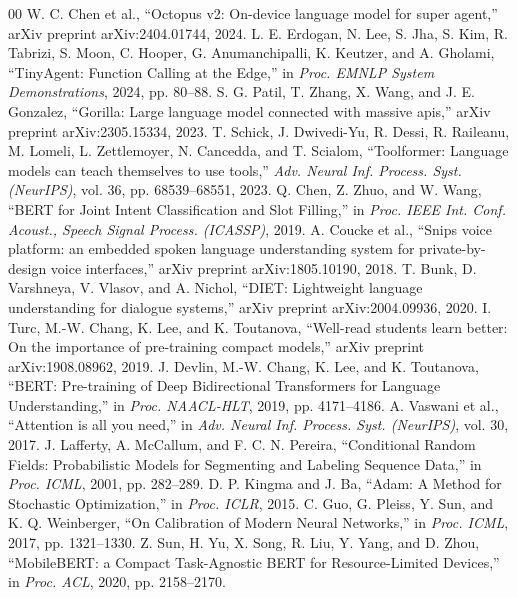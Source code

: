 \documentclass[conference]{IEEEtran}
\begin{document}
\begin{thebibliography}{00}
 W. C. Chen et al., ``Octopus v2: On-device language model for super agent,'' arXiv preprint arXiv:2404.01744, 2024.
 L. E. Erdogan, N. Lee, S. Jha, S. Kim, R. Tabrizi, S. Moon, C. Hooper, G. Anumanchipalli, K. Keutzer, and A. Gholami, ``TinyAgent: Function Calling at the Edge,'' in \emph{Proc. EMNLP System Demonstrations}, 2024, pp. 80--88.
 S. G. Patil, T. Zhang, X. Wang, and J. E. Gonzalez, ``Gorilla: Large language model connected with massive apis,'' arXiv preprint arXiv:2305.15334, 2023.
 T. Schick, J. Dwivedi-Yu, R. Dessi, R. Raileanu, M. Lomeli, L. Zettlemoyer, N. Cancedda, and T. Scialom, ``Toolformer: Language models can teach themselves to use tools,'' \emph{Adv. Neural Inf. Process. Syst. (NeurIPS)}, vol. 36, pp. 68539--68551, 2023.
 Q. Chen, Z. Zhuo, and W. Wang, ``BERT for Joint Intent Classification and Slot Filling,'' in \emph{Proc. IEEE Int. Conf. Acoust., Speech Signal Process. (ICASSP)}, 2019.
 A. Coucke et al., ``Snips voice platform: an embedded spoken language understanding system for private-by-design voice interfaces,'' arXiv preprint arXiv:1805.10190, 2018.
 T. Bunk, D. Varshneya, V. Vlasov, and A. Nichol, ``DIET: Lightweight language understanding for dialogue systems,'' arXiv preprint arXiv:2004.09936, 2020.
 I. Turc, M.-W. Chang, K. Lee, and K. Toutanova, ``Well-read students learn better: On the importance of pre-training compact models,'' arXiv preprint arXiv:1908.08962, 2019.
 J. Devlin, M.-W. Chang, K. Lee, and K. Toutanova, ``BERT: Pre-training of Deep Bidirectional Transformers for Language Understanding,'' in \emph{Proc. NAACL-HLT}, 2019, pp. 4171--4186.
 A. Vaswani et al., ``Attention is all you need,'' in \emph{Adv. Neural Inf. Process. Syst. (NeurIPS)}, vol. 30, 2017.
 J. Lafferty, A. McCallum, and F. C. N. Pereira, ``Conditional Random Fields: Probabilistic Models for Segmenting and Labeling Sequence Data,'' in \emph{Proc. ICML}, 2001, pp. 282--289.
 D. P. Kingma and J. Ba, ``Adam: A Method for Stochastic Optimization,'' in \emph{Proc. ICLR}, 2015.
 C. Guo, G. Pleiss, Y. Sun, and K. Q. Weinberger, ``On Calibration of Modern Neural Networks,'' in \emph{Proc. ICML}, 2017, pp. 1321--1330.
 Z. Sun, H. Yu, X. Song, R. Liu, Y. Yang, and D. Zhou, ``MobileBERT: a Compact Task-Agnostic BERT for Resource-Limited Devices,'' in \emph{Proc. ACL}, 2020, pp. 2158--2170.

\end{thebibliography}
\end{document}
